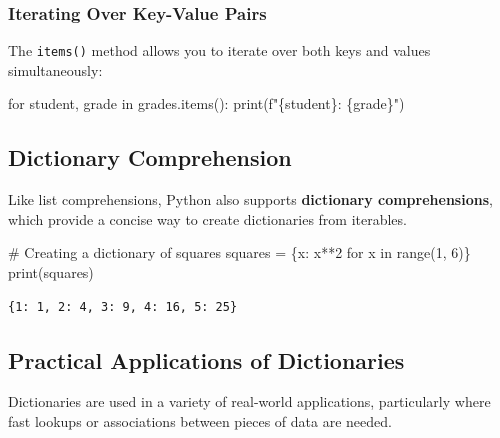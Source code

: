 \documentclass[
  letterpaper,
  DIV=11,
  numbers=noendperiod]{scrreprt}
\newenvironment{Shaded}{\begin{snugshade}}{\end{snugshade}}
\newcommand{\BuiltInTok}[1]{\textcolor[rgb]{0.00,0.23,0.31}{#1}}
\newcommand{\CommentTok}[1]{\textcolor[rgb]{0.37,0.37,0.37}{#1}}
\newcommand{\ControlFlowTok}[1]{\textcolor[rgb]{0.00,0.23,0.31}{#1}}
\newcommand{\DecValTok}[1]{\textcolor[rgb]{0.68,0.00,0.00}{#1}}
\newcommand{\KeywordTok}[1]{\textcolor[rgb]{0.00,0.23,0.31}{#1}}
\newcommand{\NormalTok}[1]{\textcolor[rgb]{0.00,0.23,0.31}{#1}}
\newcommand{\OperatorTok}[1]{\textcolor[rgb]{0.37,0.37,0.37}{#1}}
\begin{document}
\hypertarget{iterating-over-key-value-pairs}{%
\subsubsection{Iterating Over Key-Value
Pairs}\label{iterating-over-key-value-pairs}}

The \texttt{items()} method allows you to iterate over both keys and
values simultaneously:

\begin{Shaded}
\begin{Highlighting}[]
\NormalTok{for student, grade in grades.items():}
\NormalTok{    print(f"\{student\}: \{grade\}")}
\end{Highlighting}
\end{Shaded}

\hypertarget{dictionary-comprehension}{%
\subsection{Dictionary Comprehension}\label{dictionary-comprehension}}

Like list comprehensions, Python also supports \textbf{dictionary
comprehensions}, which provide a concise way to create dictionaries from
iterables.

\begin{Shaded}
\begin{Highlighting}[]
\CommentTok{\# Creating a dictionary of squares}
\NormalTok{squares }\OperatorTok{=}\NormalTok{ \{x: x}\OperatorTok{**}\DecValTok{2} \ControlFlowTok{for}\NormalTok{ x }\KeywordTok{in} \BuiltInTok{range}\NormalTok{(}\DecValTok{1}\NormalTok{, }\DecValTok{6}\NormalTok{)\}}
\BuiltInTok{print}\NormalTok{(squares)}
\end{Highlighting}
\end{Shaded}

\begin{verbatim}
{1: 1, 2: 4, 3: 9, 4: 16, 5: 25}
\end{verbatim}

\hypertarget{practical-applications-of-dictionaries}{%
\subsection{Practical Applications of
Dictionaries}\label{practical-applications-of-dictionaries}}

Dictionaries are used in a variety of real-world applications,
particularly where fast lookups or associations between pieces of data
are needed.
\end{document}
